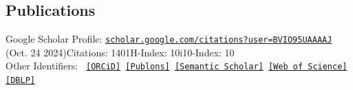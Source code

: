 \documentclass[10pt,margin,line,pifont,palatino,courier]{res}
\begin{document}
\begin{resume}
%






%


\section{\sc Publications}
	Google Scholar Profile:
	\href{https://scholar.google.com/citations?user=BVIO95UAAAAJ}{\small\texttt{scholar.google.com/citations?user=BVIO95UAAAAJ}}\\
	\hspace*{9.7em}(Oct. 24 2024)\quad Citations: 1401\quad H-Index: 10\quad i10-Index: 10\\
	Other Identifiers:
	{\footnotesize\tt
	\href{https://orcid.org/0000-0003-3813-4875}{[ORCiD]}
	\href{https://publons.com/researcher/4930582/mo-zhou}{[Publons]}
	\href{https://www.semanticscholar.org/author/Mo-Zhou/2109097390}{[Semantic Scholar]}
	\href{https://www.webofscience.com/wos/author/record/AAC-2403-2022}{[Web of Science]}
    \href{https://dblp.org/pid/24/4846}{[DBLP]}
	}


\end{resume}
\end{document}
